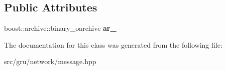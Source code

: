 \subsection*{\-Public \-Attributes}
\begin{DoxyCompactItemize}
\item 
\hypertarget{classgal_1_1network_1_1omessage_a9de736888b2431c56c24e7229e300722}{boost\-::archive\-::binary\-\_\-oarchive {\bfseries ar\-\_\-}}\label{classgal_1_1network_1_1omessage_a9de736888b2431c56c24e7229e300722}

\end{DoxyCompactItemize}


\-The documentation for this class was generated from the following file\-:\begin{DoxyCompactItemize}
\item 
src/gru/network/message.\-hpp\end{DoxyCompactItemize}
